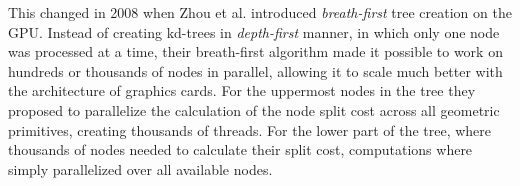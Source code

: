 This changed in 2008 when Zhou et al. introduced
\textit{breath-first} tree creation on the GPU. Instead of creating
kd-trees in \textit{depth-first} manner, in which only one node was processed
at a time, their breath-first algorithm made it possible to work on
hundreds or thousands of nodes in parallel, allowing it to scale much
better with the architecture of graphics cards. For the uppermost
nodes in the tree they proposed to parallelize the calculation of the
node split cost across all geometric primitives, creating thousands of
threads. For the lower part of the tree, where thousands of nodes
needed to calculate their split cost, computations where simply
parallelized over all available nodes.



